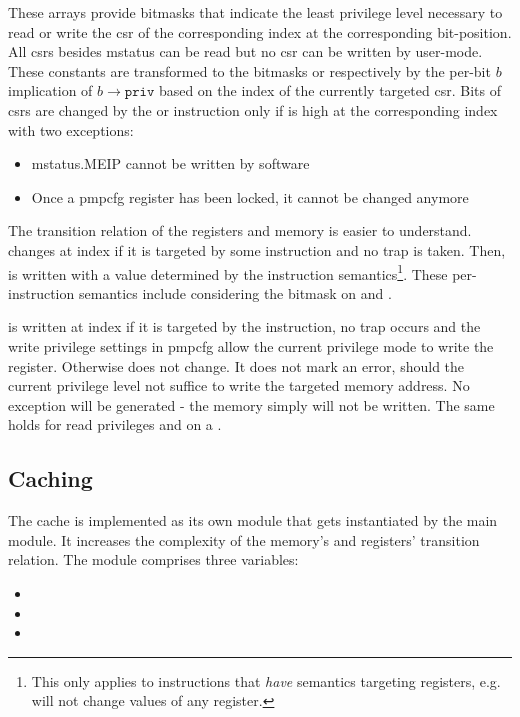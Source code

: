 These arrays provide bitmasks that indicate the least privilege level necessary to read or write the \gls{csr} of the corresponding index at the corresponding bit-position.
All \glspl{csr} besides \gls{mstatus} can be read but no \gls{csr} can be written by user-mode.
These constants are transformed to the bitmasks  or  respectively by the per-bit $ b $ implication of $ b \rightarrow \texttt{priv} $ based on the index of the currently targeted \gls{csr}.
Bits of \glspl{csr} are changed by the  or  instruction only if  is high at the corresponding index with two exceptions:
\begin{itemize}
    \item \gls{mstatus}.MEIP cannot be written by software
    \item Once a \gls{pmpcfg} register has been locked, it cannot be changed anymore
\end{itemize}

The transition relation of the registers and memory is easier to understand.
 changes at index  if it is targeted by some instruction and no trap is taken.
Then,  is written with a value determined by the instruction semantics\footnote{%
    This only applies to instructions that \textit{have} semantics targeting registers, e.g.  will not change values of any register.
}.
These per-instruction semantics include considering the  bitmask on  and .

 is written at index  if it is targeted by the  instruction, no trap occurs and the write privilege settings in \gls{pmpcfg} allow the current privilege mode to write the register.
Otherwise  does not change.
It does not mark an error, should the current privilege level not suffice to write the targeted memory address.
No exception will be generated - the memory simply will not be written.
The same holds for read privileges and  on a .

\subsection{Caching}
\label{sec:implementation-caching}

The cache is implemented as its own module that gets instantiated by the main module.
It increases the complexity of the memory's and registers' transition relation.
The module comprises three variables:
\begin{itemize}
    \item {}
    \item {}
    \item {}
\end{itemize}

